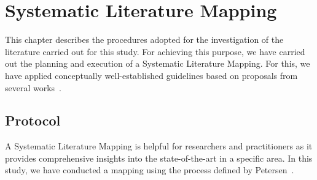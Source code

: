 \chapter{Systematic Literature Mapping}
\label{chap:slm}


This chapter describes the procedures adopted for the investigation of the literature carried out for this study.
For achieving this purpose, we have carried out the planning and execution of a Systematic Literature Mapping.
For this, we have applied conceptually well-established guidelines based on proposals from several works~\cite{Kitchenham:2007, Petersen:2008, Nakagawa:2017}.




\section{Protocol}\label{sec:slr_protocol}


A Systematic Literature Mapping is helpful for researchers and practitioners as it provides comprehensive insights into the state-of-the-art in a specific area.
In this study, we have conducted a mapping using the process defined by Petersen~\cite{Petersen:2008}.

